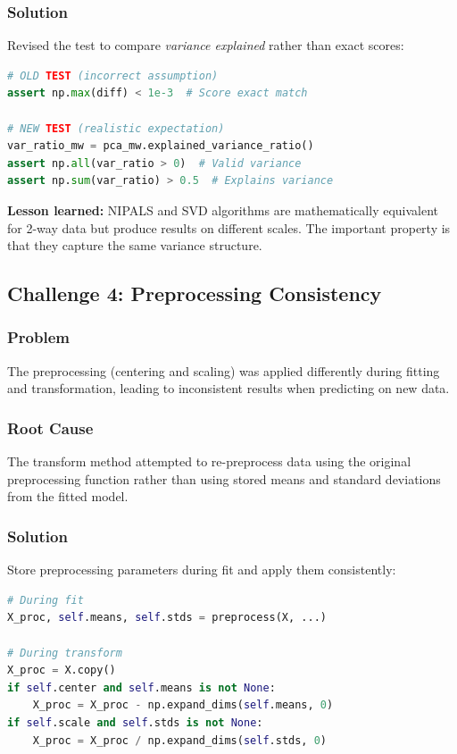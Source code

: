 \documentclass[12pt,a4paper]{article}
\begin{document}
\subsubsection{Solution}
Revised the test to compare \textit{variance explained} rather than exact scores:

\begin{lstlisting}[language=Python]
# OLD TEST (incorrect assumption)
assert np.max(diff) < 1e-3  # Score exact match

# NEW TEST (realistic expectation)
var_ratio_mw = pca_mw.explained_variance_ratio()
assert np.all(var_ratio > 0)  # Valid variance
assert np.sum(var_ratio) > 0.5  # Explains variance
\end{lstlisting}

\textbf{Lesson learned:} NIPALS and SVD algorithms are mathematically equivalent for 2-way data but produce results on different scales. The important property is that they capture the same variance structure.

\subsection{Challenge 4: Preprocessing Consistency}

\subsubsection{Problem}
The preprocessing (centering and scaling) was applied differently during fitting and transformation, leading to inconsistent results when predicting on new data.

\subsubsection{Root Cause}
The transform method attempted to re-preprocess data using the original preprocessing function rather than using stored means and standard deviations from the fitted model.

\subsubsection{Solution}
Store preprocessing parameters during fit and apply them consistently:

\begin{lstlisting}[language=Python]
# During fit
X_proc, self.means, self.stds = preprocess(X, ...)

# During transform
X_proc = X.copy()
if self.center and self.means is not None:
    X_proc = X_proc - np.expand_dims(self.means, 0)
if self.scale and self.stds is not None:
    X_proc = X_proc / np.expand_dims(self.stds, 0)
\end{lstlisting}
\end{document}
